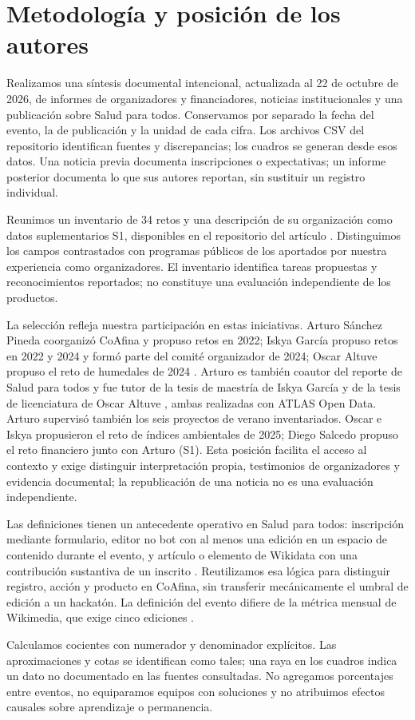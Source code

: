 \section{Metodología y posición de los autores}
Realizamos una síntesis documental intencional, actualizada al 22 de octubre de 2026, de informes de organizadores y financiadores, noticias institucionales y una publicación sobre Salud para todos. Conservamos por separado la fecha del evento, la de publicación y la unidad de cada cifra. Los archivos CSV del repositorio identifican fuentes y discrepancias; los cuadros se generan desde esos datos. Una noticia previa documenta inscripciones o expectativas; un informe posterior documenta lo que sus autores reportan, sin sustituir un registro individual.

Reunimos un inventario de 34 retos y una descripción de su organización como datos suplementarios S1, disponibles en el repositorio del artículo \cite{s1}. Distinguimos los campos contrastados con programas públicos de los aportados por nuestra experiencia como organizadores. El inventario identifica tareas propuestas y reconocimientos reportados; no constituye una evaluación independiente de los productos.

La selección refleja nuestra participación en estas iniciativas. Arturo Sánchez Pineda coorganizó CoAfina y propuso retos en 2022; Iskya García propuso retos en 2022 y 2024 y formó parte del comité organizador de 2024; Oscar Altuve propuso el reto de humedales de 2024 \cite{coafina2022,coafina2024}. Arturo es también coautor del reporte de Salud para todos \cite{salud} y fue tutor de la tesis de maestría de Iskya García \cite{tesisgarcia} y de la tesis de licenciatura de Oscar Altuve \cite{tesisaltuve}, ambas realizadas con ATLAS Open Data. Arturo supervisó también los seis proyectos de verano inventariados. Oscar e Iskya propusieron el reto de índices ambientales de 2025; Diego Salcedo propuso el reto financiero junto con Arturo (S1). Esta posición facilita el acceso al contexto y exige distinguir interpretación propia, testimonios de organizadores y evidencia documental; la republicación de una noticia no es una evaluación independiente.

Las definiciones tienen un antecedente operativo en Salud para todos: inscripción mediante formulario, editor no bot con al menos una edición en un espacio de contenido durante el evento, y artículo o elemento de Wikidata con una contribución sustantiva de un inscrito \cite{salud}. Reutilizamos esa lógica para distinguir registro, acción y producto en CoAfina, sin transferir mecánicamente el umbral de edición a un hackatón. La definición del evento difiere de la métrica mensual de Wikimedia, que exige cinco ediciones \cite{wmfactive}.

Calculamos cocientes con numerador y denominador explícitos. Las aproximaciones y cotas se identifican como tales; una raya en los cuadros indica un dato no documentado en las fuentes consultadas. No agregamos porcentajes entre eventos, no equiparamos equipos con soluciones y no atribuimos efectos causales sobre aprendizaje o permanencia.
